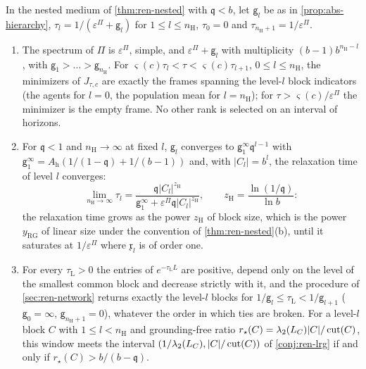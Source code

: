 \begin{theorem}\label{thm:obj-nested}
In the nested medium of \cref{thm:ren-nested} with $\mathfrak q<b$, let $\mathsf g_l$ be as in \cref{prop:abs-hierarchy}, $\tau_l=1/(\varepsilon^\Pi+\mathsf g_l)$ for $1\le l\le n_{\mathrm H}$, $\tau_0=0$ and $\tau_{n_{\mathrm H}+1}=1/\varepsilon^\Pi$.
\begin{enumerate}
\item[(a)] The spectrum of $\Pi$ is $\varepsilon^\Pi$, simple, and $\varepsilon^\Pi+\mathsf g_l$ with multiplicity $(b-1)b^{n_{\mathrm H}-l}$, with $\mathsf g_1>\dots>\mathsf g_{n_{\mathrm H}}$. For $\varsigma(c)\tau_l<\tau<\varsigma(c)\tau_{l+1}$, $0\le l\le n_{\mathrm H}$, the minimizers of $J_{\tau,c}$ are exactly the frames spanning the level-$l$ block indicators (the agents for $l=0$, the population mean for $l=n_{\mathrm H}$); for $\tau>\varsigma(c)/\varepsilon^\Pi$ the minimizer is the empty frame. No other rank is selected on an interval of horizons.
\item[(b)] For $\mathfrak q<1$ and $n_{\mathrm H}\to\infty$ at fixed $l$, $\mathsf g_l$ converges to $\mathsf g_1^\infty\mathfrak q^{l-1}$ with $\mathsf g_1^\infty=A_{\mathrm h}(1/(1-\mathfrak q)+1/(b-1))$ and, with $\lvert C_l\rvert=b^l$, the relaxation time of level $l$ converges:
\begin{equation}\label{eq:obj-scale-time}
\lim_{n_{\mathrm H}\to\infty}\tau_l=\frac{\mathfrak q\lvert C_l\rvert^{z_{\mathrm H}}}{\mathsf g_1^\infty+\varepsilon^\Pi\mathfrak q\lvert C_l\rvert^{z_{\mathrm H}}},\qquad z_{\mathrm H}=\frac{\ln(1/\mathfrak q)}{\ln b}:
\end{equation}
the relaxation time grows as the power $z_{\mathrm H}$ of block size, which is the power $y_{\mathrm{RG}}$ of linear size under the convention of \cref{thm:ren-nested}(b), until it saturates at $1/\varepsilon^\Pi$ where $\mathfrak x_l$ is of order one.
\item[(c)] For every $\tau_{\mathrm L}>0$ the entries of $e^{-\tau_{\mathrm L}L}$ are positive, depend only on the level of the smallest common block and decrease strictly with it, and the procedure of \cref{sec:ren-network} returns exactly the level-$l$ blocks for $1/\mathsf g_l\le\tau_{\mathrm L}<1/\mathsf g_{l+1}$ ($\mathsf g_0=\infty$, $\mathsf g_{n_{\mathrm H}+1}=0$), whatever the order in which ties are broken. For a level-$l$ block $C$ with $1\le l<n_{\mathrm H}$ and grounding-free ratio $r_\star(C)=\lambda_2(L_C)\lvert C\rvert/\operatorname{cut}(C)$, this window meets the interval $(1/\lambda_2(L_C),\lvert C\rvert/\operatorname{cut}(C))$ of \cref{conj:ren-lrg} if and only if $r_\star(C)>b/(b-\mathfrak q)$.
\end{enumerate}
\end{theorem}


